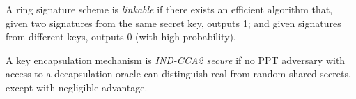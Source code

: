 \begin{definition}[Linkability]
A ring signature scheme is \textit{linkable} if there exists an efficient
algorithm that, given two signatures from the same secret key, outputs 1;
and given signatures from different keys, outputs 0 (with high probability).
\end{definition}

\begin{definition}
A key encapsulation mechanism is \textit{IND-CCA2 secure} if no PPT
adversary with access to a decapsulation oracle can distinguish real
from random shared secrets, except with negligible advantage.
\end{definition}
